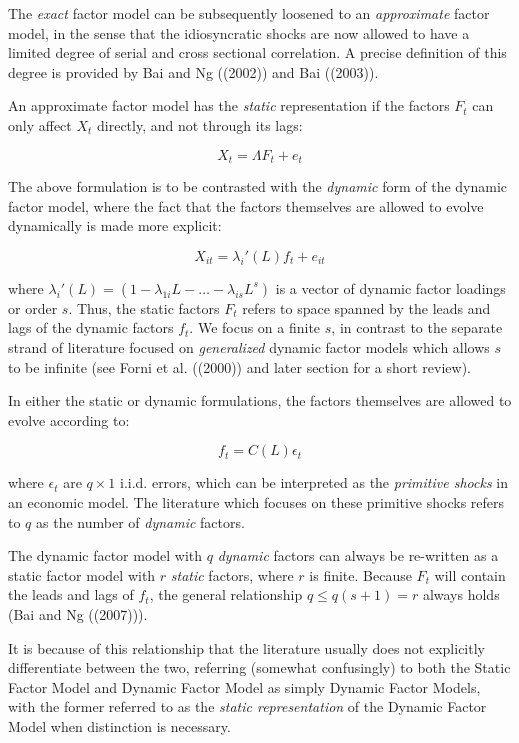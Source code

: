 \documentclass[
]{article}
\begin{document}
The \emph{exact} factor model can be subsequently loosened to an
\emph{approximate} factor model, in the sense that the idiosyncratic
shocks are now allowed to have a limited degree of serial and cross
sectional correlation. A precise definition of this degree is provided
by Bai and Ng ((2002)) and Bai ((2003)).

An approximate factor model has the \emph{static} representation if the
factors \(F_t\) can only affect \(X_t\) directly, and not through its
lags:

\[
X_t = \Lambda F_t + e_t
\]

The above formulation is to be contrasted with the \emph{dynamic} form
of the dynamic factor model, where the fact that the factors themselves
are allowed to evolve dynamically is made more explicit:

\[
X_{it} = \lambda_i'(L) f_t + e_{it}
\]

where
\(\lambda_{i}'(L) = (1 - \lambda_{1i}L - \dots - \lambda_{is}L^s)\) is a
vector of dynamic factor loadings or order \(s\). Thus, the static
factors \(F_t\) refers to space spanned by the leads and lags of the
dynamic factors \(f_t\). We focus on a finite \(s\), in contrast to the
separate strand of literature focused on \emph{generalized} dynamic
factor models which allows \(s\) to be infinite (see Forni et al.
((2000)) and later section for a short review).

In either the static or dynamic formulations, the factors themselves are
allowed to evolve according to:

\[
f_t = C(L) \epsilon_t
\]

where \(\epsilon_t\) are \(q \times 1\) i.i.d. errors, which can be
interpreted as the \emph{primitive shocks} in an economic model. The
literature which focuses on these primitive shocks refers to \(q\) as
the number of \emph{dynamic} factors.

The dynamic factor model with \(q\) \emph{dynamic} factors can always be
re-written as a static factor model with \(r\) \emph{static} factors,
where \(r\) is finite. Because \(F_t\) will contain the leads and lags
of \(f_t\), the general relationship \(q \leq q(s + 1) = r\) always
holds (Bai and Ng ((2007))).

It is because of this relationship that the literature usually does not
explicitly differentiate between the two, referring (somewhat
confusingly) to both the Static Factor Model and Dynamic Factor Model as
simply Dynamic Factor Models, with the former referred to as the
\emph{static representation} of the Dynamic Factor Model when
distinction is necessary.
\end{document}
